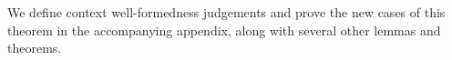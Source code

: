 \documentclass{sig-alternate}
\begin{document}
We define context well-formedness judgements and prove the new cases of this theorem in the accompanying appendix, along with several other lemmas and theorems.%





%

\end{document}
